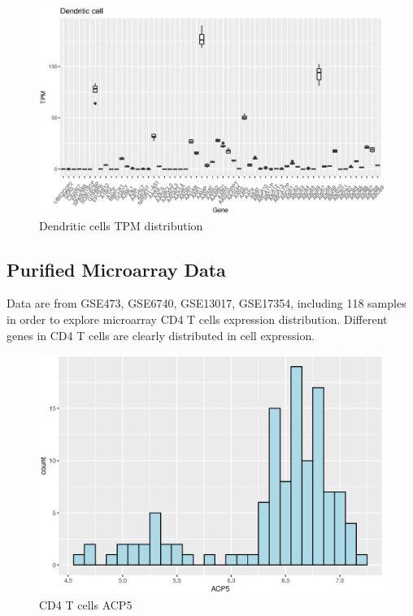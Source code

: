 \documentclass{article}
\begin{document}
 \begin{figure}[H]
     \centering
     \includegraphics[width=5in]{Dendritic_cell_50.eps}
     \caption{Dendritic cells TPM distribution }
     \label{fig:my_label}
 \end{figure}
 
 \subsection{Purified Microarray Data }
 Data are from GSE473, GSE6740, GSE13017, GSE17354, including 118 samples in order to explore microarray CD4 T cells expression distribution.
 Different genes in CD4 T cells are clearly distributed in cell expression.

\begin{figure}[H]
     \centering
     \includegraphics[width=5in]{CD4T_ACP5_log.eps}
     \caption{CD4 T cells ACP5}
     \label{fig:my_label}
\end{figure}
 
\end{document}
